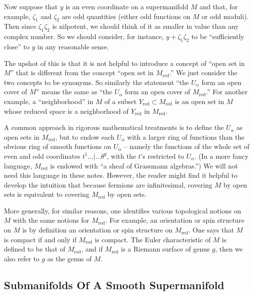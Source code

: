 \documentclass[11pt,a4paper]{article}
\def\red{{\mathrm{red}}}
\begin{document}
Now suppose that $y$ is an even coordinate on a supermanifold $M$ and 
that, for example, $\zeta_1$ and $\zeta_2$ are odd quantities (either odd 
functions on $M$ or odd moduli).
Then since $\zeta_1\zeta_2$ is nilpotent, we should think of 
it as smaller in value than any complex number.  So we should consider, 
for instance, $y+\zeta_1\zeta_2$ to
be ``sufficiently close'' to $y$ in any reasonable sense.

The upshot of this is that it is not helpful to introduce a concept of 
``open set in $M$'' that is different from the concept ``open set in $M_\red$.''    
We just consider the two
concepts to be synonyms. So similarly the statement ``the $U_\alpha$ form an 
open cover of $M$'' means the same as ``the $U_\alpha$ form an open cover 
of $M_\red$.''  For another example, a ``neighborhood'' in $M$ of a subset 
$Y_\red\subset M_\red$ is an open set in $M$ whose reduced 
space is a neighborhood of $Y_\red$ in $M_\red$.


A common approach in rigorous mathematical treatments is to define the 
$U_\alpha$ as open sets in $M_\red$, but to endow each $U_\alpha$
with a larger ring of functions than the obvious ring of smooth 
functions on $U_\alpha$ -- namely the functions of the whole set of 
even and odd coordinates $t^1\dots|\dots\theta^q$,
with the $t$'s restricted to $U_\alpha$.  (In a more fancy language, $M_\red$ is endowed
with ``a sheaf of Grassmann algebras.'') 
We will not need this language in these notes.  
However, the reader might find it helpful to develop the intuition that because fermions
are infinitesimal, covering $M$ by open sets is equivalent to covering $M_\red$ by open sets.

More generally, for similar reasons, one identifies various topological 
notions on $M$ with the same notions for $M_\red$.
For example, an orientation or spin structure on $M$ is by definition an 
orientation or spin structure on $M_\red$.  One says that $M$ is compact
if and only if $M_\red$ is compact.  
The Euler characteristic of $M$ is defined to be that of $M_\red$, and 
if $M_\red$ is a Riemann surface of genus $g$,
then we also refer to $g$ as the genus of $M$.

\subsection{Submanifolds Of A Smooth Supermanifold}\label{submanifolds}
\end{document}
